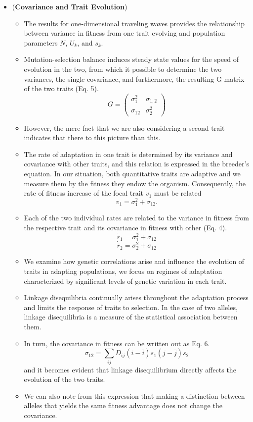 \documentclass[11pt,one column]{article}
\begin{document}
\begin{itemize}
\item (\textbf{Covariance and Trait Evolution})
\begin{itemize}
\item The results for one-dimensional traveling waves provides the relationship between variance in fitness from one trait evolving and population parameters $N$, $U_k$, and $s_k$. 
\item Mutation-selection balance induces steady state values for the speed of evolution in the two, from which it possible to determine the two variances, the single covariance, and furthermore, the resulting G-matrix of the two traits (Eq. 5). \[ G= \left( \begin{array}{cc} \sigma_1^2& \sigma_{1,2}\\ \sigma_{12} & \sigma_2^2 \end{array} \right) \]
\item However, the mere fact that we are also considering a second trait indicates that there to this picture than this.
\item The rate of adaptation in one trait is determined by its variance and covariance with other traits, and this relation is expressed in the breeder’s equation. In our situation, both quantitative traits are adaptive and we measure them by the fitness they endow the organism. Consequently, the rate of fitness increase of the focal trait $v_1$ must be related \[v_1=\sigma_1^2+\sigma_{12}.\]
\item Each of the two individual rates are related to the variance in fitness from the respective trait and its covariance in fitness with other (Eq. 4). \[ \dot{\bar{r}}_1=\sigma_1^2+\sigma_{12}\] \[ \dot{\bar{r}}_2=\sigma_2^2+\sigma_{12} \]
\item We examine how genetic correlations arise and influence the evolution of traits in adapting populations, we focus on regimes of adaptation characterized by significant levels of genetic variation in each trait. 
\item Linkage disequilibria continually arises throughout the adaptation process and limits the response of traits to selection. In the case of two alleles, linkage disequilibria is a measure of the statistical association between them. 
\item In turn, the covariance in fitness can be written out as Eq. 6. \[ \sigma_{12}=\sum_{ij}D_{ij}(i-\bar{i})s_1 (j-\bar{j}) s_2 \] and it becomes evident that linkage disequilibrium directly affects the evolution of the two traits.
\item We can also note from this expression that making a distinction between alleles that yields the same fitness advantage does not change the covariance.
\end{itemize}


\end{itemize}
\end{document}

